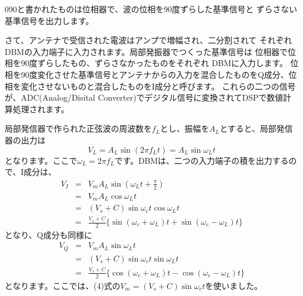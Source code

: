 090と書かれたものは位相器で、波の位相を90度ずらした基準信号と
ずらさない基準信号を出力します。

さて、アンテナで受信された電波はアンプで増幅され、二分割されて
それぞれDBMの入力端子に入力されます。局部発振器でつくった基準信号は
位相器で位相を90度ずらしたもの、ずらさなかったものをそれぞれ
DBMに入力します。
位相を90度変化させた基準信号とアンテナからの入力を混合したものをQ成分、位相を変化させないものと混合したものをI成分と呼びます。
これらの二つの信号が、ADC(Analog/Disital Converter)でデジタル信号に変換されてDSPで数値計算処理されます。

局部発信器で作られた正弦波の周波数を$f_L$とし、振幅を$A_L$とすると、局部発信器の出力は
\begin{equation}
V_L = A_L \sin(2 \pi f_L t) = A_L \sin\omega_Lt
\end{equation}
となります。ここで$\omega_L = 2\pi f_L$です。DBMは、二つの入力端子の積を出力するので、I成分は、
\begin{eqnarray}
V_I &=& V_mA_L\sin(\omega_Lt + \frac{\pi}{2}) \nonumber\\
&=& V_mA_L\cos\omega_Lt \nonumber\\
&=& (V_s + C)\sin\omega_ct\cos\omega_Lt \nonumber\\
&=& \frac{V_s + C}{2}\{\sin(\omega_c + \omega_L)t + \sin(\omega_c - \omega_L)t\} \label{eq:AM_I}
\end{eqnarray}
となり、Q成分も同様に
\begin{eqnarray}
V_Q &=& V_mA_L\sin\omega_Lt \nonumber\\
&=& (V_s + C)\sin\omega_ct\sin\omega_Lt \nonumber\\
&=& \frac{V_s + C}{2}\{\cos(\omega_c + \omega_L)t - \cos(\omega_c - \omega_L)t \}\label{eq:AM_Q}
\end{eqnarray}
となります。ここでは、(4)式の$V_m=(V_s+C)\sin\omega_ct$を使いました。


